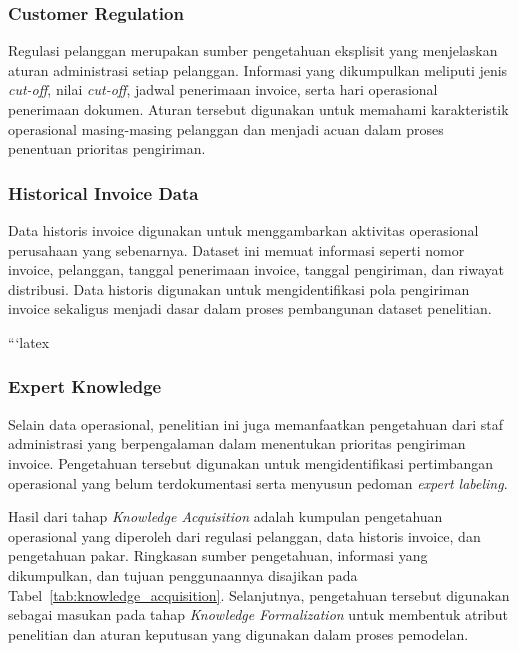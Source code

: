 \subsubsection{Customer Regulation}

Regulasi pelanggan merupakan sumber pengetahuan eksplisit yang menjelaskan aturan administrasi setiap pelanggan. Informasi yang dikumpulkan meliputi jenis \textit{cut-off}, nilai \textit{cut-off}, jadwal penerimaan invoice, serta hari operasional penerimaan dokumen. Aturan tersebut digunakan untuk memahami karakteristik operasional masing-masing pelanggan dan menjadi acuan dalam proses penentuan prioritas pengiriman.

\subsubsection{Historical Invoice Data}

Data historis invoice digunakan untuk menggambarkan aktivitas operasional perusahaan yang sebenarnya. Dataset ini memuat informasi seperti nomor invoice, pelanggan, tanggal penerimaan invoice, tanggal pengiriman, dan riwayat distribusi. Data historis digunakan untuk mengidentifikasi pola pengiriman invoice sekaligus menjadi dasar dalam proses pembangunan dataset penelitian.

```latex
\subsubsection{Expert Knowledge}

Selain data operasional, penelitian ini juga memanfaatkan pengetahuan dari staf administrasi yang berpengalaman dalam menentukan prioritas pengiriman invoice. Pengetahuan tersebut digunakan untuk mengidentifikasi pertimbangan operasional yang belum terdokumentasi serta menyusun pedoman \textit{expert labeling}.

Hasil dari tahap \textit{Knowledge Acquisition} adalah kumpulan pengetahuan operasional yang diperoleh dari regulasi pelanggan, data historis invoice, dan pengetahuan pakar. Ringkasan sumber pengetahuan, informasi yang dikumpulkan, dan tujuan penggunaannya disajikan pada Tabel~\ref{tab:knowledge_acquisition}. Selanjutnya, pengetahuan tersebut digunakan sebagai masukan pada tahap \textit{Knowledge Formalization} untuk membentuk atribut penelitian dan aturan keputusan yang digunakan dalam proses pemodelan.

